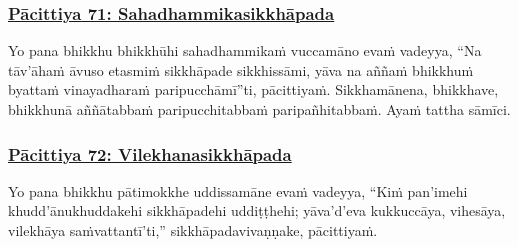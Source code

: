 \subsubsection*{\hyperref[exp71]{Pācittiya 71: Sahadhammikasikkhāpada}}
\label{pac71}

Yo pana bhikkhu bhikkhūhi sahadhammikaṁ vuccamāno evaṁ vadeyya, ``Na tāv'āhaṁ āvuso etasmiṁ sikkhāpade sikkhissāmi, yāva na aññaṁ\makeatletter\hyperlink{endnote380-appendix}\makeatother{} bhikkhuṁ byattaṁ\makeatletter\hyperlink{endnote381-appendix}\makeatother{} vinayadharaṁ paripucchāmī''ti, pācittiyaṁ. Sikkhamānena, bhikkhave, bhikkhunā aññātabbaṁ paripucchitabbaṁ paripañhitabbaṁ.\makeatletter\hyperlink{endnote382-appendix}\makeatother{} Ayaṁ tattha sāmīci.



\subsubsection*{\hyperref[exp72]{Pācittiya 72: Vilekhanasikkhāpada}}
\label{pac72}

Yo pana bhikkhu pātimokkhe\makeatletter\hyperlink{endnote383-appendix}\makeatother{} uddissamāne evaṁ vadeyya, ``Kiṁ pan'imehi\makeatletter\hyperlink{endnote384-appendix}\makeatother{} khudd'ānukhuddakehi sikkhāpadehi uddiṭṭhehi; yāva'd'eva kukkuccāya, vihesāya, vilekhāya saṁvattantī'ti,'' sikkhāpadavivaṇṇake,\makeatletter
\hyperlink{endnote385-appendix}\makeatother{} pācittiyaṁ.



